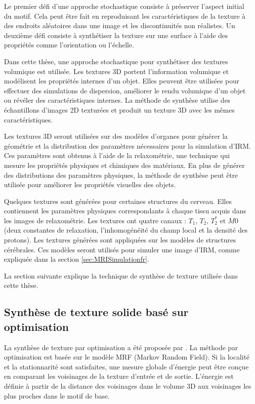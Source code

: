 Le premier défi d'une approche stochastique consiste à préserver l'aspect initial du motif.
Cela peut être fait en reproduisant les caractéristiques de la texture à des endroits aléatoires 
dans une image et les discontinuités non réalistes.
Un deuxième défi consiste à synthétiser la texture sur une surface à l'aide des propriétés comme l'orientation ou l'échelle.

Dans cette thèse, une approche stochastique pour synthétiser des textures volumique est utilisée.
Les textures 3D portent l'information volumique et modélisent les propriétés internes d'un objet.
Elles peuvent être utilisées pour effectuer des simulations de dispersion, 
améliorer le rendu volumique d'un objet ou révéler des caractéristiques internes.
La méthode de synthèse 
utilise des échantillons d'images 
2D texturées et produit un texture 3D avec les mêmes caractéristiques.

Les textures 3D seront utilisées sur des modèles d'organes pour générer la géométrie 
et la distribution des paramètres nécessaires pour la simulation d'IRM.
Ces paramètres sont obtenus à l'aide de la relaxométrie, 
une technique qui mesure les propriétés physiques et chimiques des matériaux.
En plus de générer des distributions des paramètres physiques, 
la méthode de synthèse peut être utilisée pour améliorer les propriétés visuelles des objets.

Quelques textures sont générées pour certaines structures du cerveau.
Elles contiennent les paramètres physiques correspondants à chaque tissu acquis dans les images de relaxométrie.
Les textures ont quatre canaux : $T_1$, $T_2$, $T_2^*$ et $M0$ (deux constantes de relaxation, 
l'inhomogénéité du champ local et la densité des protons).
Les textures générées sont appliquées sur les modèles de structures cérébrales.
Ces modèles seront utilisés pour simuler une image d'IRM,
comme expliquée dans la section \ref{sec:MRISimulationfr}.

La section suivante explique la technique de synthèse de texture utilisée dans cette thèse.

\subsection{Synthèse de texture solide basé sur optimisation}

La synthèse de texture par optimisation a été proposée par \cite{kwatra:2005:SIGGRAPH}.
La méthode par optimisation est basée sur le modèle MRF (Markov Random Field). 
Si la localité et la stationnarité sont satisfaites, 
une mesure globale d'énergie peut être conçue en comparant les voisinages de la texture d'entrée et de sortie.
L'énergie est définie à partir de la distance des voisinages 
dans le volume 3D aux voisinages les plus proches dans le motif de base. 

